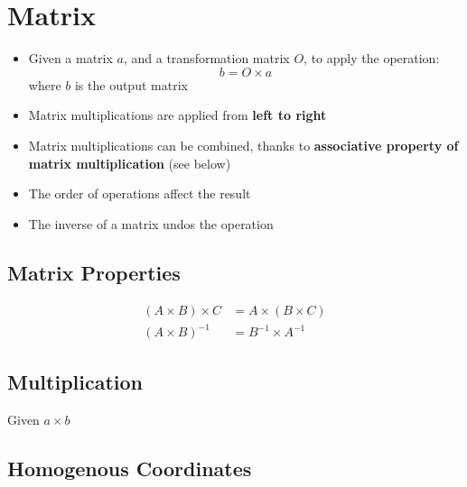 \chapter{Matrix}

\begin{itemize}
  \item Given a matrix $ a $, and a transformation matrix $ O $, to apply
  the operation:
  \begin{equation}
    b = O \times a
  \end{equation}
  where $ b $ is the output matrix

  \item Matrix multiplications are applied from \textbf{left to right}
  \item Matrix multiplications can be combined, thanks to \textbf{associative
  property of matrix multiplication} (see below)
  \item The order of operations affect the result
  \item The inverse of a matrix undos the operation
\end{itemize}

\section{Matrix Properties}

  \begin{align}
    \left( A \times B \right) \times C &= A \times \left( B \times C \right) \\
    \left( A \times B \right)^{-1} &= B^{-1} \times A^{-1}
  \end{align}

\section{Multiplication}

  Given $ a \times b $

  \begin{algorithm}[H]
  \end{algorithm}

\section{Homogenous Coordinates}

